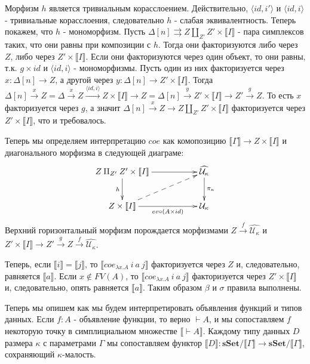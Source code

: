 \documentclass{amsart}
\theoremstyle{definition}
\theoremstyle{remark}
\newcommand{\cat}[1]{\mathbf{#1}}
\newcommand{\sSet}{\cat{sSet}}
\renewcommand{\ll}{\llbracket}
\newcommand{\rr}{\rrbracket}
\numberwithin{figure}{section}
\begin{document}
\begin{itemize}
Морфизм $h$ является тривиальным корасслоением.
Действительно, $\langle id, i' \rangle$ и $\langle id, i \rangle$ - тривиальные корасслоения, следовательно $h$ - слабая эквивалентность.
Теперь покажем, что $h$ - мономорфизм.
Пусть $\Delta[n] \rightrightarrows Z \amalg_{Z'} Z' \times \ll I \rr$ - пара симплексов таких, что они равны при композиции с $h$.
Тогда они факторизуются либо через $Z$, либо через $Z' \times \ll I \rr$.
Если они факторизуются через один объект, то они равны, т.к. $g \times id$ и $\langle id, i \rangle$ - мономорфизмы.
Пусть один из них факторизуется через $x : \Delta[n] \to Z$, а другой через $y : \Delta[n] \to Z' \times \ll I \rr$.
Тогда $\Delta[n] \xrightarrow{x} Z = \Delta \xrightarrow{x} Z \xrightarrow{\langle id, i \rangle} Z \times \ll I \rr \to Z = \Delta[n] \xrightarrow{y} Z' \times \ll I \rr \to Z' \xrightarrow{g} Z$.
То есть $x$ факторизуется через $g$, а значит $\Delta[n] \xrightarrow{x} Z \to Z \amalg_{Z'} Z' \times \ll I \rr$ факторизуется через $Z' \times \ll I \rr$, что и требовалось.

Теперь мы определяем интерпретацию $coe$ как комопозицию $\ll \Gamma \rr \to Z \times \ll I \rr$ и диагонального морфизма в следующей диаграме:
\[ \xymatrix{ Z \amalg_{Z'} Z' \times \ll I \rr \ar[rr] \ar[d]_h                  & & \widehat{\mathcal{U}_\kappa} \ar[d]^{\pi_\kappa} \\
              Z \times \ll I \rr \ar[rr]_-{ev \circ (A \times id)} \ar@{-->}[urr] & & \mathcal{U}_\kappa
            }\]
Верхний горизонтальный морфизм порождается морфизмами $Z \xrightarrow{f} \widehat{\mathcal{U}_\kappa}$
    и $Z' \times \ll I \rr \to Z' \xrightarrow{g} Z \xrightarrow{f} \widehat{\mathcal{U}_\kappa}$.

Теперь, если $\ll i \rr = \ll j \rr$, то $\ll coe_{\lambda x. A}\ i\ a\ j \rr$ факторизуется через $Z$ и, следовательно, равняется $\ll a \rr$.
Если $x \notin FV(A)$, то $\ll coe_{\lambda x. A}\ i\ a\ j \rr$ факторизуется через $Z' \times \ll I \rr$ и, следовательно, опять равняется $\ll a \rr$.
Таким образом $\beta$ и $\sigma$ правила выполнены.
\end{itemize}

Теперь мы опишем как мы будем интерпретировать объявления функций и типов данных.
Если $f : A$ - объявление функции, то верно $\vdash A$, и мы сопоставляем $f$ некоторую точку в симплициальном множестве $\ll \vdash A \rr$.
Каждому типу данных $D$ размера $\kappa$ с параметрами $\Gamma$ мы сопоставляем функтор $\ll D \rr : \sSet / \ll \Gamma \rr \to \sSet / \ll \Gamma \rr$, сохраняющий $\kappa$-малость.
\end{document}
